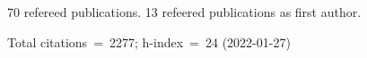 70 refereed publications. 13 refeered publications as first author.

Total citations~=~2277; h-index~=~24 (2022-01-27)